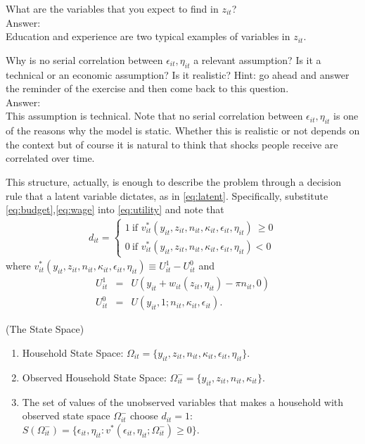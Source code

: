 \begin{exercise}
What are the variables that you expect to find in $z_{it}$?\\
\noindent Answer:\\
\noindent Education and experience are two typical examples of variables in $z_{it}$.
\end{exercise}

\begin{exercise}
Why is no serial correlation between $\epsilon_{it}, \eta_{it}$ a relevant assumption? Is it a technical or an economic assumption? Is it realistic? Hint: go ahead and answer the reminder of the exercise and then come back to this question.\\
\noindent Answer:\\
\noindent This assumption is technical. Note that no serial correlation between $\epsilon_{it}, \eta_{it}$ is one of the reasons why the model is static. Whether this is realistic or not depends on the context but of course it is natural to think that shocks people receive are correlated over time. 
\end{exercise}

\indent This structure, actually, is enough to describe the problem through a decision rule that a latent variable dictates, as in \eqref{eq:latent}. Specifically, substitute \eqref{eq:budget},\eqref{eq:wage} into \eqref{eq:utility} and note that
\begin{eqnarray}
d_{it} =
\begin{cases}
1 \  \text{if }  v_{it}^* \left( y_{it}, z_{it}, n_{it}, \kappa_{it}, \epsilon_{it}, \eta_{it} \right) \ \geq 0  \\
0 \  \text{if }  v_{it}^* \left( y_{it}, z_{it}, n_{it}, \kappa_{it}, \epsilon_{it}, \eta_{it} \right)  < 0 \label{eq:latent2}
\end{cases}
\end{eqnarray}
where $v_{it}^* \left( y_{it}, z_{it}, n_{it}, \kappa_{it}, \epsilon_{it}, \eta_{it} \right) \equiv U_{it}^1 - U_{it}^0$ and
\begin{eqnarray}
U_{it}^1 &=& U(y_{it} + w_{it}(z_{it}, \eta_{it}) - \pi n_{it}, 0) \\
U_{it}^0 &=& U(y_{it}, 1; n_{it}, \kappa_{it}, \epsilon_{it}).
\end{eqnarray}

\begin{definition} (The State Space)
\begin{enumerate}
\item Household State Space: $\Omega_{it} = \{ y_{it}, z_{it}, n_{it}, \kappa_{it}, \epsilon_{it}, \eta_{it} \}$.
\item Observed Household State Space: $\Omega_{it}^- = \{ y_{it}, z_{it}, n_{it}, \kappa_{it} \}$.
\item The set of values of the unobserved variables that makes a household with observed state space $\Omega_{it}^-$ choose $d_{it} = 1$: $S \left(  \Omega_{it}^- \right) = \{ \epsilon_{it}, \eta_{it}:  v^* \left(\epsilon_{it}, \eta_{it} ; \Omega_{it}^- \right) \geq 0 \}$. 
\end{enumerate}
\end{definition}

